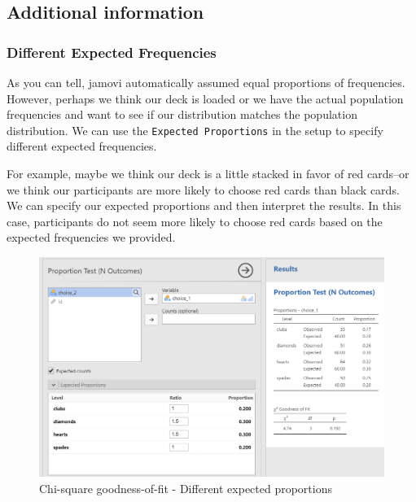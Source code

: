 \documentclass[
]{book}
\begin{document}
\hypertarget{additional-information-1}{%
\subsection{Additional information}\label{additional-information-1}}

\hypertarget{different-expected-frequencies}{%
\subsubsection{Different Expected Frequencies}\label{different-expected-frequencies}}

As you can tell, jamovi automatically assumed equal proportions of frequencies. However, perhaps we think our deck is loaded or we have the actual population frequencies and want to see if our distribution matches the population distribution. We can use the \texttt{Expected\ Proportions} in the setup to specify different expected frequencies.

For example, maybe we think our deck is a little stacked in favor of red cards--or we think our participants are more likely to choose red cards than black cards. We can specify our expected proportions and then interpret the results. In this case, participants do not seem more likely to choose red cards based on the expected frequencies we provided.

\begin{figure}

{\centering \includegraphics[width=1\linewidth]{images/09-chi-square/chi-square_results2} 

}

\caption{Chi-square goodness-of-fit - Different expected proportions}\label{fig:unnamed-chunk-3}
\end{figure}
\end{document}
